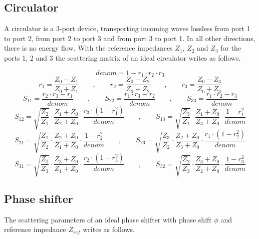 \subsection{Circulator}
\label{sec:CirculatorSparameter}

A circulator is a 3-port device, transporting incoming waves lossless
from port 1 to port 2, from port 2 to port 3 and from port 3 to port
1.  In all other directions, there is no energy flow.  With the
reference impedances $Z_1$, $Z_2$ and $Z_3$ for the ports 1, 2 and 3
the scattering matrix of an ideal circulator writes as follows.

\begin{equation}
denom = 1-r_1\cdot r_2\cdot r_3
\end{equation}
\begin{equation}
r_1 = \frac{Z_0-Z_1}{Z_0+Z_1} \qquad,\qquad 
r_2 = \frac{Z_0-Z_2}{Z_0+Z_2} \qquad,\qquad 
r_3 = \frac{Z_0-Z_3}{Z_0+Z_3}
\end{equation}
\begin{equation}
S_{11} = \frac{r_2\cdot r_3 - r_1}{denom} \qquad,\qquad
S_{22} = \frac{r_1\cdot r_3 - r_2}{denom} \qquad,\qquad 
S_{33} = \frac{r_1\cdot r_2 - r_3}{denom}
\end{equation}
\begin{equation}
S_{12} = \sqrt{\frac{Z_2}{Z_1}}\cdot\frac{Z_1+Z_0}{Z_2+Z_0}\cdot\frac{r_3\cdot(1-r_1^2)}{denom}
\qquad,\qquad 
S_{13} = \sqrt{\frac{Z_3}{Z_1}}\cdot\frac{Z_1+Z_0}{Z_3+Z_0}\cdot\frac{1-r_1^2}{denom}
\end{equation}
\begin{equation}
S_{21} = \sqrt{\frac{Z_1}{Z_2}}\cdot\frac{Z_2+Z_0}{Z_1+Z_0}\cdot\frac{1-r_2^2}{denom}
\qquad,\qquad 
S_{23} = \sqrt{\frac{Z_3}{Z_2}}\cdot\frac{Z_2+Z_0}{Z_3+Z_0}\cdot\frac{r_1\cdot(1-r_2^2)}{denom}
\end{equation}
\begin{equation}
S_{31} = \sqrt{\frac{Z_1}{Z_3}}\cdot\frac{Z_3+Z_0}{Z_1+Z_0}\cdot\frac{r_2\cdot(1-r_3^2)}{denom}
\qquad,\qquad 
S_{32} = \sqrt{\frac{Z_2}{Z_3}}\cdot\frac{Z_3+Z_0}{Z_2+Z_0}\cdot\frac{1-r_3^2}{denom}
\end{equation}

\subsection{Phase shifter}

The scattering parameters of an ideal phase shifter with phase shift
$\phi$ and reference impedance $Z_{ref}$ writes as follows.

